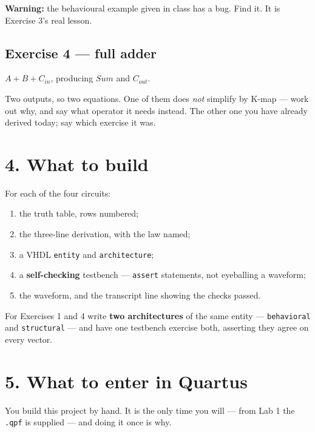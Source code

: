 \documentclass[11pt]{article}
\newcommand{\code}[1]{\texttt{#1}}
\begin{document}
\textbf{Warning:} the behavioural example given in class has a bug. Find it. It is
Exercise 3's real lesson.

\subsection*{Exercise 4 --- full adder}

$A + B + C_{in}$, producing $Sum$ and $C_{out}$.

Two outputs, so two equations. One of them does \emph{not} simplify by K-map ---
work out why, and say what operator it needs instead. The other one you have
already derived today; say which exercise it was.

\section*{4. What to build}

For each of the four circuits:

\begin{enumerate}[leftmargin=2em,itemsep=2pt]
\item the truth table, rows numbered;
\item the three-line derivation, with the law named;
\item a VHDL \code{entity} and \code{architecture};
\item a \textbf{self-checking} testbench --- \code{assert} statements, not
eyeballing a waveform;
\item the waveform, and the transcript line showing the checks passed.
\end{enumerate}

For Exercises 1 and 4 write \textbf{two architectures} of the same entity ---
\code{behavioral} and \code{structural} --- and have one testbench exercise both,
asserting they agree on every vector.

\section*{5. What to enter in Quartus}

You build this project by hand. It is the only time you will --- from Lab 1 the
\code{.qpf} is supplied --- and doing it once is why.
\end{document}
